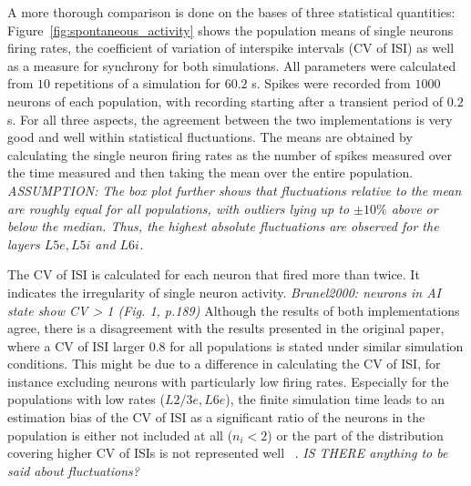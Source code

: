 A more thorough comparison is done on the bases of three statistical quantities: 
Figure~\ref{fig:spontaneous_activity} shows the population means of single neurons firing rates, 
the coefficient of variation of interspike intervals (CV of ISI) as well as a measure for synchrony for both 
simulations. All parameters were calculated from $10$ repetitions of a simulation for 
$60.2$ s. Spikes were recorded from $1000$ neurons of each population, with recording 
starting after a transient period of $0.2$ s. 
For all three aspects, the agreement between the two implementations is very good 
and well within statistical fluctuations. 
The means are obtained by calculating the single neuron firing rates as 
the number of spikes measured over the time measured and then taking the mean over the entire population. 
\emph{ASSUMPTION: The box plot further shows that 
fluctuations relative to the mean are roughly equal for all populations, with outliers lying 
up to $\pm 10 \%$ above or below the median. Thus, the highest absolute fluctuations are observed 
for the layers $L5e, L5i$ and $L6i$.} 

The CV of ISI is calculated for each neuron that fired more than twice. 
It indicates the irregularity of single neuron activity.\cite{potjans2014} 
\emph{Brunel2000: neurons in AI state show CV > 1 (Fig. 1, p.189)}
Although the results of both implementations agree, there is a disagreement with the results presented 
in the original paper, where a CV of ISI larger 0.8 for all populations is stated
under similar simulation conditions\cite{potjans2014}. 
This might be due to a difference in calculating the CV of ISI, for instance excluding neurons 
with particularly low firing rates. 
Especially 
for the populations with low rates ($L2/3e, L6e$), the finite simulation time leads to an estimation bias
of the CV of ISI as a significant ratio of the neurons in the population is either not included at all 
($n_i < 2$) or the part of the distribution covering higher CV of ISIs is not represented well~%
\cite{grun2010analysis}. 
\emph{IS THERE anything to be said about fluctuations?}


